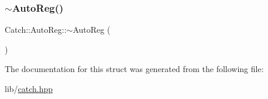 \subsubsection{\texorpdfstring{$\sim$\+Auto\+Reg()}{~AutoReg()}}
{\footnotesize\ttfamily Catch\+::\+Auto\+Reg\+::$\sim$\+Auto\+Reg (\begin{DoxyParamCaption}{ }\end{DoxyParamCaption})}



The documentation for this struct was generated from the following file\+:\begin{DoxyCompactItemize}
\item 
lib/\hyperlink{catch_8hpp}{catch.\+hpp}\end{DoxyCompactItemize}
